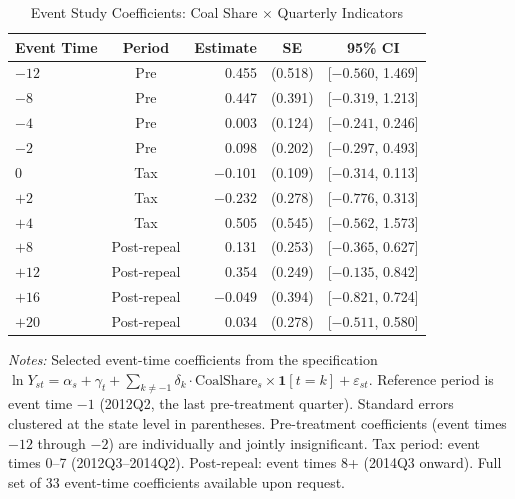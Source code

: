 \begin{table}[H]
\centering
\caption{Event Study Coefficients: Coal Share $\times$ Quarterly Indicators}
\begin{threeparttable}
\begin{tabular}{lcrcc}
\toprule
Event Time & Period & Estimate & SE & 95\% CI \\
\midrule
$-12$ & Pre & 0.455 & (0.518) & [$-0.560$, 1.469] \\
$-8$ & Pre & 0.447 & (0.391) & [$-0.319$, 1.213] \\
$-4$ & Pre & 0.003 & (0.124) & [$-0.241$, 0.246] \\
$-2$ & Pre & 0.098 & (0.202) & [$-0.297$, 0.493] \\
\midrule
0 & Tax & $-0.101$ & (0.109) & [$-0.314$, 0.113] \\
$+2$ & Tax & $-0.232$ & (0.278) & [$-0.776$, 0.313] \\
$+4$ & Tax & 0.505 & (0.545) & [$-0.562$, 1.573] \\
\midrule
$+8$ & Post-repeal & 0.131 & (0.253) & [$-0.365$, 0.627] \\
$+12$ & Post-repeal & 0.354 & (0.249) & [$-0.135$, 0.842] \\
$+16$ & Post-repeal & $-0.049$ & (0.394) & [$-0.821$, 0.724] \\
$+20$ & Post-repeal & 0.034 & (0.278) & [$-0.511$, 0.580] \\
\bottomrule
\end{tabular}
\begin{tablenotes}[flushleft]
\small
\item \textit{Notes:} Selected event-time coefficients from the specification $\ln Y_{st} = \alpha_s + \gamma_t + \sum_{k \neq -1} \delta_k \cdot \text{CoalShare}_s \times \mathbf{1}[t = k] + \varepsilon_{st}$. Reference period is event time $-1$ (2012Q2, the last pre-treatment quarter). Standard errors clustered at the state level in parentheses. Pre-treatment coefficients (event times $-12$ through $-2$) are individually and jointly insignificant. Tax period: event times 0--7 (2012Q3--2014Q2). Post-repeal: event times 8+ (2014Q3 onward). Full set of 33 event-time coefficients available upon request.
\end{tablenotes}
\end{threeparttable}
\label{tab:event_study}
\end{table}
